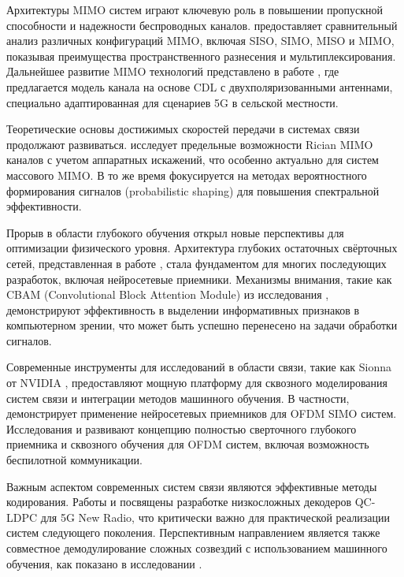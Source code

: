 \documentclass{article}
\begin{document}
Архитектуры MIMO систем играют ключевую роль в повышении пропускной способности и надежности беспроводных каналов. \citet{shah2017performance} предоставляет сравнительный анализ различных конфигураций MIMO, включая SISO, SIMO, MISO и MIMO, показывая преимущества пространственного разнесения и мультиплексирования. Дальнейшее развитие MIMO технологий представлено в работе \citet{pessoa2020cdl}, где предлагается модель канала на основе CDL с двухполяризованными антеннами, специально адаптированная для сценариев 5G в сельской местности.

Теоретические основы достижимых скоростей передачи в системах связи продолжают развиваться. \citet{bjornson2015achievable} исследует предельные возможности Rician MIMO каналов с учетом аппаратных искажений, что особенно актуально для систем массового MIMO. В то же время \citet{caire2017achievable} фокусируется на методах вероятностного формирования сигналов (probabilistic shaping) для повышения спектральной эффективности.

Прорыв в области глубокого обучения открыл новые перспективы для оптимизации физического уровня. Архитектура глубоких остаточных свёрточных сетей, представленная в работе \citet{he2016deep}, стала фундаментом для многих последующих разработок, включая нейросетевые приемники. Механизмы внимания, такие как CBAM (Convolutional Block Attention Module) из исследования \citet{woo2018cbam}, демонстрируют эффективность в выделении информативных признаков в компьютерном зрении, что может быть успешно перенесено на задачи обработки сигналов.

Современные инструменты для исследований в области связи, такие как Sionna от NVIDIA \citep{sionna}, предоставляют мощную платформу для сквозного моделирования систем связи и интеграции методов машинного обучения. В частности, \citet{sionna2023neural} демонстрирует применение нейросетевых приемников для OFDM SIMO систем. Исследования \citet{levis2020deeprx} и \citet{levis2020end} развивают концепцию полностью сверточного глубокого приемника и сквозного обучения для OFDM систем, включая возможность беспилотной коммуникации.

Важным аспектом современных систем связи являются эффективные методы кодирования. Работы \citet{nguyen2019efficient} и \citet{nguyen2021low} посвящены разработке низкосложных декодеров QC-LDPC для 5G New Radio, что критически важно для практической реализации систем следующего поколения. Перспективным направлением является также совместное демодулирование сложных созвездий с использованием машинного обучения, как показано в исследовании \citet{gansekoele2025joint}.
\end{document}

